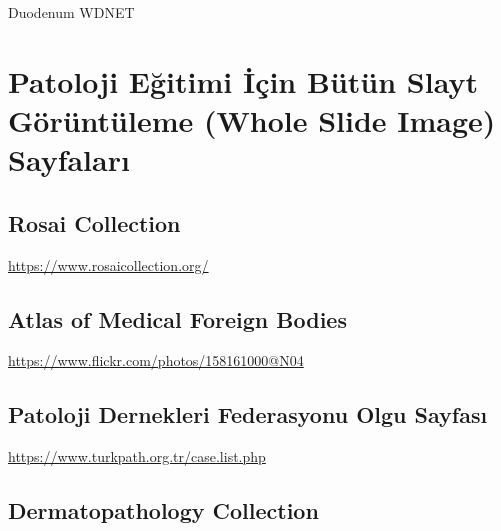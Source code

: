 \documentclass[
  letterpaper,
  DIV=11,
  numbers=noendperiod]{scrreprt}
\begin{document}
\begin{tcolorbox}[enhanced jigsaw, colbacktitle=quarto-callout-tip-color!10!white, colback=white, titlerule=0mm, opacityback=0, colframe=quarto-callout-tip-color-frame, opacitybacktitle=0.6, bottomrule=.15mm, breakable, coltitle=black, title=\textcolor{quarto-callout-tip-color}{\faLightbulb}\hspace{0.5em}{Tanı}, toprule=.15mm, toptitle=1mm, bottomtitle=1mm, arc=.35mm, rightrule=.15mm, leftrule=.75mm, left=2mm]

Duodenum WDNET

\end{tcolorbox}

\hypertarget{sec-wsi-sayfalari}{%
\chapter{Patoloji Eğitimi İçin Bütün Slayt Görüntüleme (Whole Slide
Image) Sayfaları}\label{sec-wsi-sayfalari}}

\hypertarget{sec-rosai-collection}{%
\section{Rosai Collection}\label{sec-rosai-collection}}

\url{https://www.rosaicollection.org/}

\hypertarget{sec-atlas-of-medical-foreign-bodies}{%
\section{Atlas of Medical Foreign
Bodies}\label{sec-atlas-of-medical-foreign-bodies}}

\url{https://www.flickr.com/photos/158161000@N04}

\hypertarget{patoloji-dernekleri-federasyonu-olgu-sayfasux131}{%
\section{Patoloji Dernekleri Federasyonu Olgu
Sayfası}\label{patoloji-dernekleri-federasyonu-olgu-sayfasux131}}

\url{https://www.turkpath.org.tr/case.list.php}

\hypertarget{dermatopathology-collection}{%
\section{Dermatopathology
Collection}\label{dermatopathology-collection}}
\end{document}
